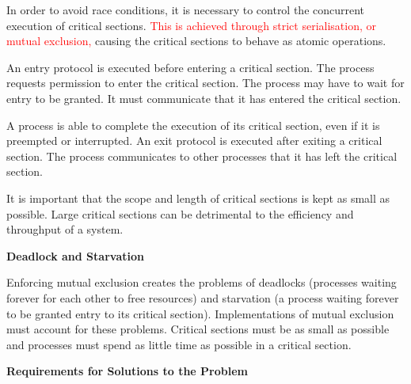 In order to avoid race conditions, it is necessary to control the concurrent execution of critical sections.
\textcolor{red}{This is achieved through strict serialisation, or mutual exclusion,} causing the critical sections to behave as atomic operations.

An entry protocol is executed before entering a critical section.
The process requests permission to enter the critical section.
The process may have to wait for entry to be granted.
It must communicate that it has entered the critical section.

A process is able to complete the execution of its critical section, even if it is preempted or interrupted.
An exit protocol is executed after exiting a critical section.
The process communicates to other processes that it has left the critical section.

It is important that the scope and length of critical sections is kept as small as possible.
Large critical sections can be detrimental to the efficiency and throughput of a system.

\textbf{Deadlock and Starvation}

Enforcing mutual exclusion creates the problems of deadlocks (processes waiting forever for each other to free resources) and starvation (a process waiting forever to be granted entry to its critical section).
Implementations of mutual exclusion must account for these problems.
Critical sections must be as small as possible and processes must spend as little time as possible in a critical section.

\textbf{Requirements for Solutions to the Problem}

